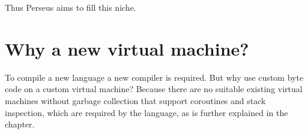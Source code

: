 	Thus Perseus aims to fill this niche.
	
	\section{Why a new virtual machine?}
	
	To compile a new language a new compiler is required. But why use custom byte code on a custom virtual machine? Because there are no suitable existing virtual machines without garbage collection that support coroutines and stack inspection, which are required by the language, as is further explained in the  chapter.
